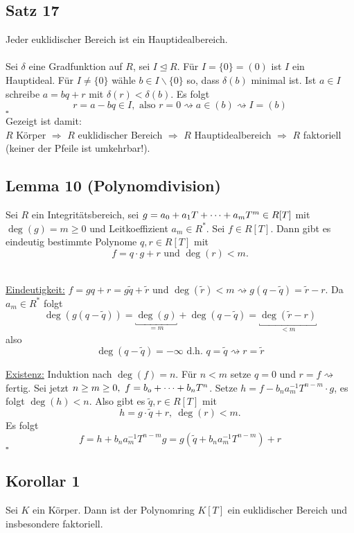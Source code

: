 \subsection{Satz 17}
\label{sub:satz_17}
Jeder euklidischer Bereich ist ein Hauptidealbereich.\\

\\
Sei $\delta$ eine Gradfunktion auf $R$, sei $I\trianglelefteq R$.
Für $I=\{0\}=(0)$ ist $I$ ein Hauptideal.
Für $I\neq \{0\}$ wähle $b\in I\backslash\{0\}$ so, dass $\delta(b)$ minimal ist.
Ist $a\in I$ schreibe $a=bq+r$ mit $\delta(r)<\delta(b)$.
Es folgt
\[
r=a-bq\in I,\text{ also } r=0\rightsquigarrow a\in (b) \rightsquigarrow I=(b)
\]
\hfill $\square$\\
Gezeigt ist damit:\\
$R$ Körper $\Rightarrow$ $R$ euklidischer Bereich $\Rightarrow$ $R$ Hauptidealbereich $\Rightarrow$ $R$ faktoriell\\
(keiner der Pfeile ist umkehrbar!).

\subsection{Lemma 10 (Polynomdivision)}
\label{sub:polynomdivision}
Sei $R$ ein Integritätsbereich, sei $g=a_0+a_1T+ \dots +a_mT^m\in R[T]$ mit $\deg(g)=m\ge 0$ und Leitkoeffizient $a_m\in R^*$.
Sei $f\in R[T]$.
Dann gibt es eindeutig bestimmte Polynome $q,r\in R[T]$ mit
\[
f=q\cdot g+r \text{ und } \deg(r)<m.
\]

\\
\uline{Eindeutigkeit:}
$f=gq+r=g\tilde{q}+\tilde{r}$ und $\deg(\tilde{r})<m \rightsquigarrow g(q-\tilde{q})=\tilde{r}-r.$
Da $a_m\in R^*$ folgt
\[
\deg(g(q-\tilde{q}))=\underbracket{\deg(g)}_{=m}+\deg(q-\tilde{q})=\underbracket{\deg(\tilde{r}-r)}_{<m}
\]
also
\[
\deg(q-\tilde{q})=-\infty \text{ d.h. } q=\tilde{q} \rightsquigarrow r=\tilde{r}
\]

\uline{Existenz:}
Induktion nach $\deg(f)=n$.
Für $n<m$ setze $q=0$ und $r=f\rightsquigarrow$ fertig.
Sei jetzt $n\ge m\ge 0,~ f=b_o+ \dots +b_nT^n$.
Setze $h=f-b_na_m^{-1}T^{n-m}\cdot g$, es folgt $\deg(h)<n$.
Also gibt es $\tilde{q},r\in R[T]$ mit
\[
h=g\cdot \tilde{q}+r,~\deg(r)<m.
\]
Es folgt
\[
f=h+b_na_m^{-1}T^{n-m}g=g(\tilde{q}+b_na_m^{-1}T^{n-m})+r
\]
\hfill $\square$

\subsection{Korollar 1}
\label{sub:korllar_1}
Sei $K$ ein Körper.
Dann ist der Polynomring $K[T]$ ein euklidischer Bereich und insbesondere faktoriell.\\

